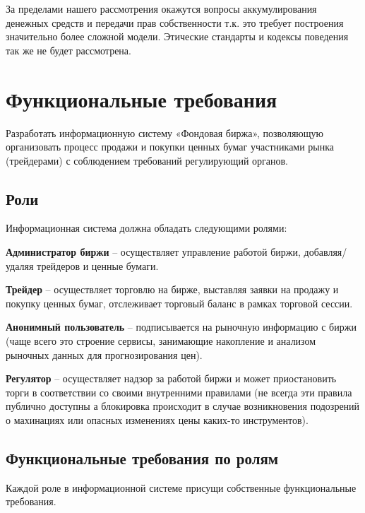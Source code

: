 \documentclass[a4paper, 12pt]{article}        %
\begin{document}
За пределами нашего рассмотрения окажутся вопросы аккумулирования денежных средств и передачи прав собственности т.к. это требует построения значительно более сложной модели. Этические стандарты и кодексы поведения так же не будет рассмотрена.

\newpage
\section{Функциональные требования}

Разработать информационную систему «Фондовая биржа», позволяющую организовать процесс продажи и покупки ценных бумаг участниками рынка (трейдерами) с соблюдением требований регулирующий органов.

\subsection{Роли}
Информационная система должна обладать следующими ролями:

\textbf{Администратор биржи} -- осуществляет управление работой биржи, добавляя/удаляя трейдеров и ценные бумаги.

\textbf{Трейдер} -- осуществляет торговлю на бирже, выставляя заявки на продажу и покупку ценных бумаг, отслеживает торговый баланс в рамках торговой сессии.

\textbf{Анонимный пользователь} -- подписывается на рыночную информацию с биржи (чаще всего это строение сервисы, занимающие накопление и анализом рыночных данных для прогнозирования цен).

\textbf{Регулятор} -- осуществляет надзор за работой биржи и может приостановить торги в соответствии со своими внутренними правилами (не всегда эти правила публично доступны а блокировка происходит в случае возникновения подозрений о махинациях или опасных изменениях цены каких-то инструментов).


\subsection{Функциональные требования по ролям}

Каждой роле в информационной системе присущи собственные функциональные требования.
\end{document}
